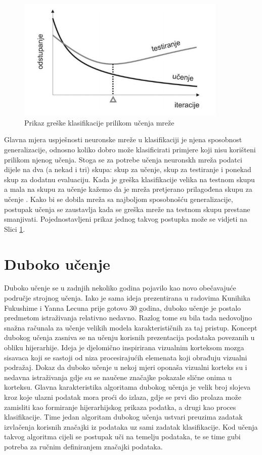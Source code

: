 \documentclass[lmodern, utf8, diplomski, numeric]{fer}
\begin{document}
\begin{figure}[ht!]
\centering
\includegraphics[width=10cm]{slike/generalization.png}
\caption{Prikaz greške klasifikacije prilikom učenja mreže}
\label{fig:generalization}
\end{figure}

Glavna mjera uspješnosti neuronske mreže u klasifikaciji je njena sposobnost generalizacije, odnosno koliko dobro može klasificirati primjere koji nisu korišteni prilikom njenog učenja. Stoga se za potrebe učenja neuronskh mreža podatci dijele na dva (a nekad i tri) skupa: skup za učenje, skup za testiranje i ponekad skup za dodatnu evaluaciju. Kada je greška klasifikacije velika na testnom skupu a mala na skupu za učenje kažemo da je mreža pretjerano prilagođena skupu za učenje . Kako bi se dobila mreža sa najboljom sposobnošću generalizacije, postupak učenja se zaustavlja kada se greška mreže na testnom skupu prestane smanjivati. Pojednostavljeni prikaz jednog takvog postupka može se vidjeti na Slici \ref{fig:generalization}. 




\chapter{Duboko učenje}

Duboko učenje se u zadnjih nekoliko godina pojavilo kao novo obečavajuće područje strojnog učenja. Iako je sama ideja prezentirana u radovima Kunihika Fukushime \cite{fukushima1980deep} i Yanna Lecuna \cite{lecun1989zipcode} prije gotovo 30 godina, duboko učenje je postalo predmetom istraživanja relativno nedavno. Razlog tome su bila tada nedovoljno snažna računala za učenje velikih modela karakterističnih za taj pristup. Koncept dubokog učenja zasniva se na učenju korisnih prezentacija podataka povezanih u obliku hijerarhije. Ideja je djelomično inspirirana vizualnim korteksom mozga sisavaca koji se sastoji od niza procesirajućih elemenata koji obrađuju vizualni podražaj. Dokaz da duboko učenje u nekoj mjeri oponaša vizualni korteks su i nedavna istraživanja gdje su se naučene značajke pokazale slične onima u korteksu. Glavna karakteristika algoritama dubokog učenja je velik broj slojeva kroz koje ulazni podatak mora proći do izlaza, gdje se prvi dio prolaza može zamisliti kao formiranje hijerarhijskog prikaza podatka, a drugi kao proces klasifikacije. Time jedan algoritam dubokog učenja ustvari preuzima zadatak izvlačenja korisnih značajki iz podataka uz sami zadatak klasifikacije. Kod učenja takvog algoritma cijeli se postupak uči na temelju podataka, te se time gubi potreba za ručnim definiranjem značajki podataka. 
\end{document}
